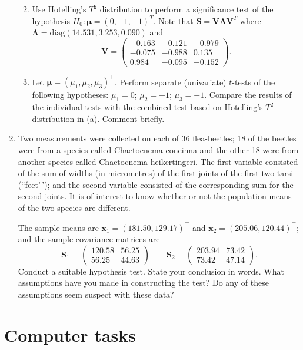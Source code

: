 \documentclass[
]{book}
\providecommand{\tightlist}{%
  \setlength{\itemsep}{0pt}\setlength{\parskip}{0pt}}
\theoremstyle{definition}
\theoremstyle{definition}
\theoremstyle{definition}
\theoremstyle{definition}
\theoremstyle{remark}
\begin{document}
\begin{enumerate}
  \begin{enumerate}
  \def\labelenumii{\roman{enumii}.}
  \tightlist
  \item
    Use Hotelling's \(T^2\) distribution to perform a significance test of the hypothesis \(H_0: {\boldsymbol{\mu}}= (0,-1,-1)^T\). Note that \(\mathbf S= \mathbf V\boldsymbol \Lambda\mathbf V^T\) where \(\boldsymbol \Lambda= \text{diag}(14.531, 3.253,0.090)\) and
    \[\mathbf V= \begin{pmatrix} -0.163 & -0.121 & -0.979 \\ -0.075 & -0.988 & 0.135 \\ 0.984 & -0.095 & -0.152 \end{pmatrix}.\]
  \item
    Let \({\boldsymbol{\mu}}= (\mu_1,\mu_2,\mu_3)^\top\). Perform separate (univariate) \(t\)-tests of the following hypotheses: \(\mu_1 = 0\); \(\mu_2 = -1\); \(\mu_3 = -1\). Compare the results of the individual tests with the combined test based on Hotelling's \(T^2\) distribution in (a). Comment briefly.
  \end{enumerate}
\item
  Two measurements were collected on each of 36 flea-beetles; 18 of the beetles were from a species called Chaetocnema concinna and the other 18 were from another species called Chaetocnema heikertingeri. The first variable consisted of the sum of widths (in micrometres) of the first joints of the first two tarsi (``feet'\,'); and the second variable consisted of the corresponding sum for the second joints. It is of interest to know
  whether or not the population means of the two species are different.

  The sample means are \(\bar{\mathbf x}_1 = (181.50,129.17)^\top\) and \(\bar{\mathbf x}_2 = (205.06,120.44)^\top\); and the sample covariance matrices are
  \[\mathbf S_1 = \begin{pmatrix} 120.58 & 56.25 \\ 56.25 & 44.63 \end{pmatrix} \qquad
  \mathbf S_2 = \begin{pmatrix} 203.94 & 73.42 \\ 73.42 & 47.14 \end{pmatrix}.\]
  Conduct a suitable hypothesis test. State your conclusion in words. What assumptions have you made in constructing the test? Do any of these assumptions seem suspect with these data?
\end{enumerate}

\hypertarget{computer-tasks-3}{%
\section{Computer tasks}\label{computer-tasks-3}}
\end{document}
